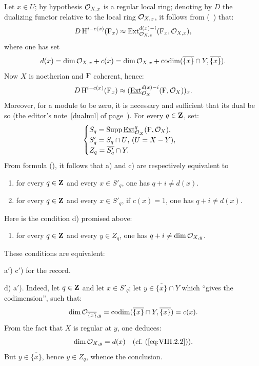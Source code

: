 Let $x\in U$; by hypothesis ${\mathcal O}_{X, x}$ is a regular local ring; denoting by $D$ the dualizing functor relative to the local ring ${\mathcal O}_{X, x}$, it follows from (~) that:
\[D\operatorname{H}^{i-c(x)}({\operatorname{F}}_x)\approx \operatorname{Ext}^{d(x)-i}_{{\mathcal O}_{X, x}}({\operatorname{F}}_x, {\mathcal O}_{X, x}), \]
where one has set
\begin{equation} \label{eq:VIII.2.2} d(x)=\dim {\mathcal O}_{X, x} + c(x) = \dim {\mathcal O}_{X, x}+\operatorname{codim}(\overline{\{x\}}\cap Y, \overline{\{x\}}).
\end{equation}
Now $X$ is noetherian and ${\operatorname{F}}$ coherent, hence:
\begin{equation} \label{eq:VIII.2.3} D\operatorname{H}^{i-c(x)}({\operatorname{F}}_x)\approx (\operatorname{\underline{Ext}}^{d(x)-i}_{\mathcal{O}_X}({\operatorname{F}}, \mathcal{O}_X))_x.
\end{equation}
Moreover, for a module to be zero, it is necessary and sufficient that its dual be so (\cf the editor's note~\eqref{dualnul} of page~\pageref{dualnul}). For every $q\in\mathbf{Z}$, set:
\begin{equation} \label{eq:VIII.2.4}
\begin{cases}
S_q=\operatorname{Supp} \operatorname{\underline{Ext}}^q_{\mathcal{O}_X}({\operatorname{F}}, \mathcal{O}_X), \\
S'_q=S_q\cap U\text{, (}U=X-Y\text{)}, \\
Z_q=\overline{S'_q}\cap Y.
\end{cases}
\end{equation}
From formula (), it follows that a) and c) are respectively equivalent to
\begin{enumerate}
\item[a$'$)]
for every $q\in\mathbf{Z}$ and every $x\in S'_q$, one has $q+i\neq d(x)$.

\item[c$'$)]
for every $q\in\mathbf{Z}$ and every $x\in S'_q$, if $c(x)=1$, one has $q+i\neq d(x)$.
\end{enumerate}
\noindent Here is the condition d) promised above:
\begin{enumerate}
\item[d)]
for every $q\in \mathbf{Z}$ and every $y\in Z_q$, one has $q+i\neq \dim {\mathcal O}_{X, y}$.
\end{enumerate}
\noindent These conditions are equivalent:

a$'$) \ALORS c$'$) for the record.

d) \ALORS a$'$). Indeed, let $q\in \mathbf{Z}$ and let $x\in S'_q$; let $y\in\overline{\{x\}}\cap Y$ which ``gives the codimension'', \ie such that:
\begin{equation} \label{eq:VIII.2.5} \dim {\mathcal O}_{\overline{\{x\}}, y}=\operatorname{codim}(\overline{\{x\}}\cap Y, \overline{\{x\}})=c(x).
\end{equation}
From the fact that $X$ is regular at $y$, one deduces:
\begin{equation} \label{eq:VIII.2.6} \dim \Oo_{X, y}=d(x)\quad \text{(\cf (\Ref{eq:VIII.2.2})).}
\end{equation}
But $y\in\overline{\{x\}}$, hence $y\in Z_q$, whence the conclusion.

